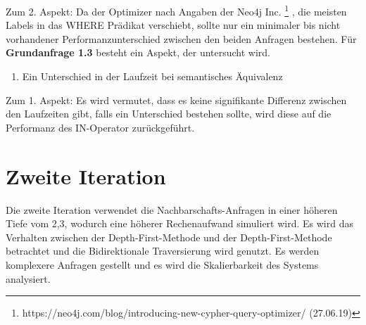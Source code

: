 Zum 2. Aspekt: Da der Optimizer nach Angaben der Neo4j Inc. \footnote{https://neo4j.com/blog/introducing-new-cypher-query-optimizer/ (27.06.19)} , die meisten Labels in das WHERE Prädikat verschiebt, sollte nur ein minimaler bis nicht vorhandener Performanzunterschied zwischen den beiden Anfragen bestehen. \newline \newline
Für \textbf{Grundanfrage 1.3} besteht ein Aspekt, der untersucht wird. 
\begin{enumerate}
	\item Ein Unterschied in der Laufzeit bei  semantisches Äquivalenz  
\end{enumerate}
Zum 1. Aspekt: Es wird vermutet, dass es keine signifikante Differenz zwischen den Laufzeiten gibt, falls ein Unterschied bestehen sollte, wird diese auf die Performanz des IN-Operator zurückgeführt.

\section{Zweite Iteration}
Die zweite Iteration verwendet die Nachbarschafts-Anfragen in einer höheren Tiefe vom 2,3, wodurch eine höherer Rechenaufwand simuliert wird. Es wird das Verhalten zwischen der Depth-First-Methode und der Depth-First-Methode betrachtet und die Bidirektionale Traversierung wird genutzt. Es werden komplexere Anfragen gestellt und es wird die Skalierbarkeit des Systems analysiert. 

